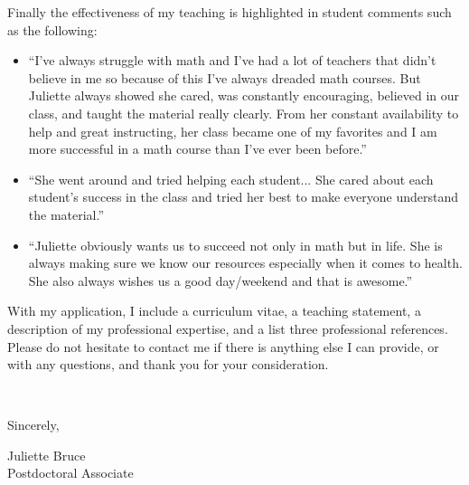 \documentclass[11pt]{article}
\begin{document}
Finally the effectiveness of my teaching is highlighted in student comments such as the following:
\begin{itemize}[leftmargin=*]
\item ``I’ve always struggle with math and I’ve had a lot of teachers that didn’t believe in me so because of this I’ve always dreaded math courses. But Juliette always showed she cared, was constantly encouraging, believed in our class, and taught the material really clearly. From her constant availability to help and great instructing, her class became one of my favorites and I am more successful in a math course than I’ve ever been before.''
\item ``She went around and tried helping each student... She cared about each student’s success in the class and tried her best to make everyone understand the material.''
\item ``Juliette obviously wants us to succeed not only in math but in life. She is always making sure we know our resources especially when it comes to health. She also always wishes us a good day/weekend and that is awesome.''
\end{itemize}

With my application, I include a curriculum vitae, a teaching statement, a description of my professional expertise, and a list three professional references. Please do not hesitate to contact me if there is anything else I can provide, or with any questions, and thank you for your consideration. 

\vspace{24pt}
\noindent
\begin{minipage}{0.99\textwidth}
\begin{minipage}{0.69\textwidth}
\textcolor{white}{.}
\end{minipage}
\begin{minipage}{0.29\textwidth}
Sincerely, 

\vspace{20pt}
Juliette Bruce\\
Postdoctoral Associate\end{minipage}
\end{minipage}

\end{document}
